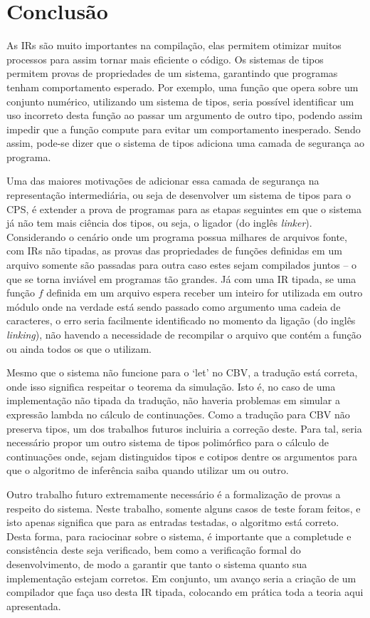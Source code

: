 \section{Conclusão}\label{sec:conclusao}
As IRs são muito importantes na compilação, elas permitem otimizar muitos processos para assim tornar mais eficiente o código.
Os sistemas de tipos permitem provas de propriedades de um sistema, garantindo que programas tenham comportamento esperado.
Por exemplo, uma função que opera sobre um conjunto numérico, utilizando um sistema de tipos, seria possível identificar um uso incorreto desta função ao passar um argumento de outro tipo, podendo assim impedir que a função compute para evitar um comportamento inesperado.
Sendo assim, pode-se dizer que o sistema de tipos adiciona uma camada de segurança ao programa.

Uma das maiores motivações de adicionar essa camada de segurança na representação intermediária, ou seja de desenvolver um sistema de tipos para o CPS, é extender a prova de programas para as etapas seguintes em que o sistema já não tem mais ciência dos tipos, ou seja, o ligador (do inglês \textit{linker}).
Considerando o cenário onde um programa possua milhares de arquivos fonte, com IRs não tipadas, as provas das propriedades de funções definidas em um arquivo somente são passadas para outra caso estes sejam compilados juntos -- o que se torna inviável em programas tão grandes.
Já com uma IR tipada, se uma função $f$ definida em um arquivo espera receber um inteiro for utilizada em outro módulo onde na verdade está sendo passado como argumento uma cadeia de caracteres, o erro seria facilmente identificado no momento da ligação (do inglês \textit{linking}), não havendo a necessidade de recompilar o arquivo que contém a função ou ainda todos os que o utilizam.

Mesmo que o sistema não funcione para o `let' no CBV, a tradução está correta, onde isso significa respeitar o teorema da simulação.
Isto é, no caso de uma implementação não tipada da tradução, não haveria problemas em simular a expressão lambda no cálculo de continuações.
Como a tradução para CBV não preserva tipos, um dos trabalhos futuros incluiria a correção deste.
Para tal, seria necessário propor um outro sistema de tipos polimórfico para o cálculo de continuações onde, sejam distinguidos tipos e cotipos dentre os argumentos para que o algoritmo de inferência saiba quando utilizar um ou outro.

Outro trabalho futuro extremamente necessário é a formalização de provas a respeito do sistema.
Neste trabalho, somente alguns casos de teste foram feitos, e isto apenas significa que para as entradas testadas, o algoritmo está correto.
Desta forma, para raciocinar sobre o sistema, é importante que a completude e consistência deste seja verificado, bem como a verificação formal do desenvolvimento, de modo a garantir que tanto o sistema quanto sua implementação estejam corretos.
Em conjunto, um avanço seria a criação de um compilador que faça uso desta IR tipada, colocando em prática toda a teoria aqui apresentada.
